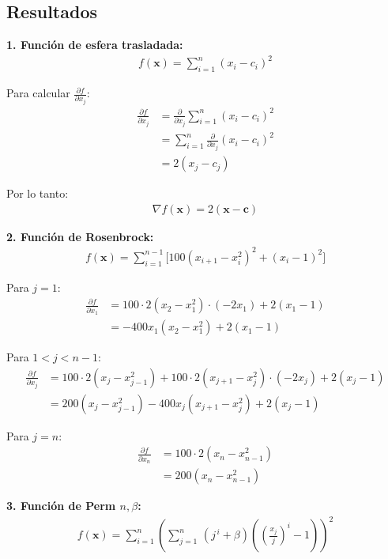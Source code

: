 \documentclass{article}
\begin{document}
\subsection{Resultados}
\setcounter{equation}{0}

\textbf{1. Función de esfera trasladada:}
\begin{align}
f(\mathbf{x}) = \sum_{i=1}^{n} (x_i - c_i)^2
\end{align}

Para calcular $\frac{\partial f}{\partial x_j}$:
\begin{align}
\frac{\partial f}{\partial x_j} &= \frac{\partial}{\partial x_j} \sum_{i=1}^{n} (x_i - c_i)^2 \\
&= \sum_{i=1}^{n} \frac{\partial}{\partial x_j} (x_i - c_i)^2 \\
&= 2(x_j - c_j)
\end{align}

Por lo tanto:
\begin{align}
\nabla f(\mathbf{x}) = 2(\mathbf{x} - \mathbf{c})
\end{align}

\textbf{2. Función de Rosenbrock:}
\begin{align}
f(\mathbf{x}) = \sum_{i=1}^{n-1} \Big[ 100(x_{i+1} - x_i^{2})^{2} + (x_i - 1)^{2} \Big]
\end{align}

Para $j = 1$:
\begin{align}
\frac{\partial f}{\partial x_1} &= 100 \cdot 2(x_2 - x_1^2) \cdot (-2x_1) + 2(x_1 - 1) \\
&= -400x_1(x_2 - x_1^2) + 2(x_1 - 1)
\end{align}

Para $1 < j < n-1$:
\begin{align}
\frac{\partial f}{\partial x_j} &= 100 \cdot 2(x_j - x_{j-1}^2) + 100 \cdot 2(x_{j+1} - x_j^2) \cdot (-2x_j) + 2(x_j - 1) \\
&= 200(x_j - x_{j-1}^2) - 400x_j(x_{j+1} - x_j^2) + 2(x_j - 1)
\end{align}

Para $j = n$:
\begin{align}
\frac{\partial f}{\partial x_n} &= 100 \cdot 2(x_n - x_{n-1}^2) \\
&= 200(x_n - x_{n-1}^2)
\end{align}

\textbf{3. Función de Perm $n,\beta$:}
\begin{align}
f(\mathbf{x}) = \sum_{i=1}^{n} \left( \sum_{j=1}^{n}\,(j^{\,i} + \beta)\left( \left(\frac{x_j}{j}\right)^{i} - 1 \right) \right)^{2}
\end{align}
\end{document}
